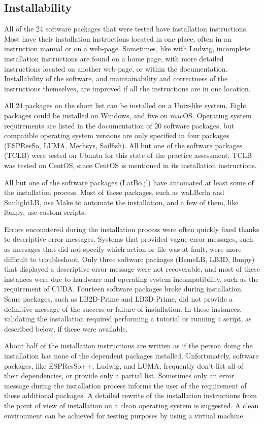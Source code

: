 \documentclass[final, 3p, times, authoryear]{elsarticle}
\begin{document}
\subsection{Installability}

All of the 24 software packages that were tested have installation instructions.
Most have their installation instructions located in one place, often in an
instruction manual or on a web-page. Sometimes, like with Ludwig, incomplete
installation instructions are found on a home page, with more detailed
instructions located on another web-page, or within the documentation.
Installability of the software, and maintainability and correctness of the
instructions themselves, are improved if all the instructions are in one
location. 

All 24 packages on the short list can be installed on a Unix-like system. Eight
packages could be installed on Windows, and five on macOS. Operating system
requirements are listed in the documentation of 20 software packages, but
compatible operating system versions are only specified in four packages
(ESPResSo, LUMA, Mechsys, Sailfish). All but one of the software packages (TCLB)
were tested on Ubuntu for this state of the practice assessment. TCLB was tested
on CentOS, since CentOS is mentioned in its installation instructions.

All but one of the software packages (LatBo.jl) have automated at least some of
the installation process. Most of these packages, such as waLBerla and
SunlightLB, use Make to automate the installation, and a few of them, like
lbmpy, use custom scripts.

Errors encountered during the installation process were often quickly fixed
thanks to descriptive error messages. Systems that provided vague error
messages, such as messages that did not specify which action or file was at
fault, were more difficult to troubleshoot. Only three software packages
(HemeLB, LB3D, lbmpy) that displayed a descriptive error message were not
recoverable, and most of these instances were due to hardware and operating
system incompatibility, such as the requirement of CUDA. Fourteen software
packages broke during installation. Some packages, such as LB2D-Prime and
LB3D-Prime, did not provide a definitive message of the success or failure of
installation. In these instances, validating the installation required
performing a tutorial or running a script, as described below, if these were
available. 

About half of the installation instructions are written as if the person doing
the installation has none of the dependent packages installed. Unfortunately,
software packages, like ESPResSo++, Ludwig, and LUMA, frequently don't list all
of their dependencies, or provide only a partial list. Sometimes only an error
message during the installation process informs the user of the requirement of
these additional packages. A detailed rewrite of the installation instructions
from the point of view of installation on a clean operating system is suggested.
A clean environment can be achieved for testing purposes by using a virtual
machine.
\end{document}
